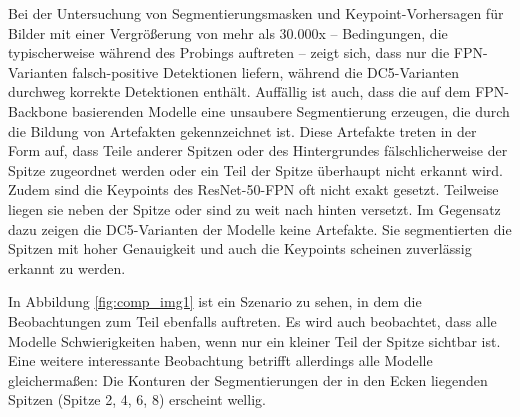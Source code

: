 Bei der Untersuchung von Segmentierungsmasken und Keypoint-Vorhersagen für Bilder mit einer Vergrößerung von mehr als 30.000x – Bedingungen, die typischerweise während des Probings auftreten – zeigt sich, dass nur die FPN-Varianten falsch-positive Detektionen liefern, während die DC5-Varianten durchweg korrekte Detektionen enthält.
Auffällig ist auch, dass die auf dem FPN-Backbone basierenden Modelle eine unsaubere Segmentierung erzeugen, die durch die Bildung von Artefakten gekennzeichnet ist. Diese Artefakte treten in der Form auf, dass Teile anderer Spitzen oder des Hintergrundes fälschlicherweise der Spitze zugeordnet werden oder ein Teil der Spitze überhaupt nicht erkannt wird. Zudem sind die Keypoints des ResNet-50-FPN oft nicht exakt gesetzt. Teilweise liegen sie neben der Spitze oder sind zu weit nach hinten versetzt. Im Gegensatz dazu zeigen die DC5-Varianten der Modelle keine Artefakte. Sie segmentierten die Spitzen mit hoher Genauigkeit und auch die Keypoints scheinen zuverlässig erkannt zu werden.

In Abbildung \ref{fig:comp_img1} ist ein Szenario zu sehen, in dem die Beobachtungen zum Teil ebenfalls auftreten.
Es wird auch beobachtet, dass alle Modelle Schwierigkeiten haben, wenn nur ein kleiner Teil der Spitze sichtbar ist. Eine weitere interessante Beobachtung betrifft allerdings alle Modelle gleichermaßen: Die Konturen der Segmentierungen der in den Ecken liegenden Spitzen (Spitze 2, 4, 6, 8) erscheint wellig.

